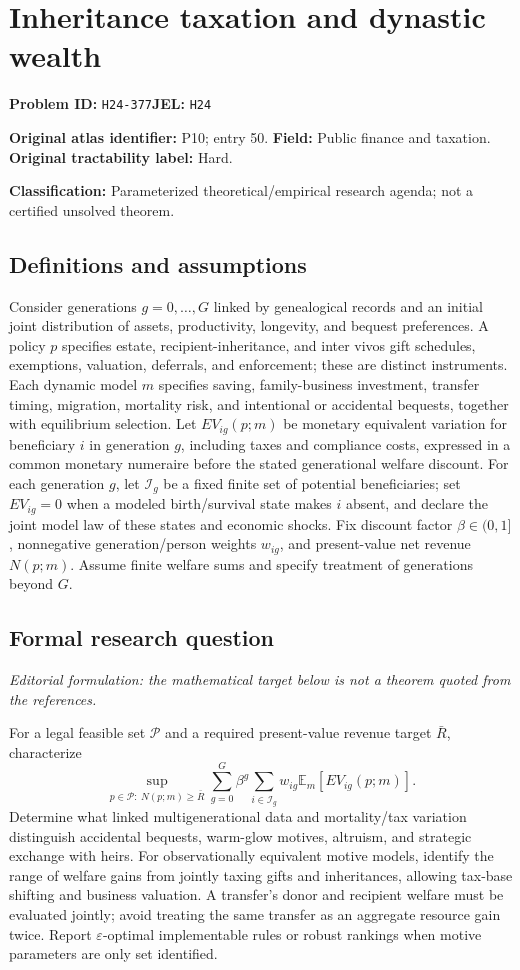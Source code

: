 \documentclass[11pt,a4paper]{article}
\begin{document}
\section*{Inheritance taxation and dynastic wealth}
\textbf{Problem ID:} \texttt{H24-377}\quad \textbf{JEL:} \texttt{H24}\par
\label{problem:OP-0050}
\label{atlas:prob:P10}
\noindent\textbf{Original atlas identifier:} P10; entry 50. \textbf{Field:} Public finance and taxation. \textbf{Original tractability label:} Hard.

\noindent\textbf{Classification:} Parameterized theoretical/empirical research agenda; not a certified unsolved theorem.

\subsection*{Definitions and assumptions}
Consider generations $g=0,\ldots,G$ linked by genealogical records and an initial joint distribution of assets, productivity, longevity, and bequest preferences. A policy $p$ specifies estate, recipient-inheritance, and inter vivos gift schedules, exemptions, valuation, deferrals, and enforcement; these are distinct instruments. Each dynamic model $m$ specifies saving, family-business investment, transfer timing, migration, mortality risk, and intentional or accidental bequests, together with equilibrium selection. Let $EV_{ig}(p;m)$ be monetary equivalent variation for beneficiary $i$ in generation $g$, including taxes and compliance costs, expressed in a common monetary numeraire before the stated generational welfare discount. For each generation $g$, let $\mathcal I_g$ be a fixed finite set of potential beneficiaries; set $EV_{ig}=0$ when a modeled birth/survival state makes $i$ absent, and declare the joint model law of these states and economic shocks. Fix discount factor $\beta\in(0,1]$, nonnegative generation/person weights $w_{ig}$, and present-value net revenue $N(p;m)$. Assume finite welfare sums and specify treatment of generations beyond $G$.

\subsection*{Formal research question}
\emph{Editorial formulation: the mathematical target below is not a theorem quoted from the references.}

For a legal feasible set $\mathcal P$ and a required present-value revenue target $\bar R$, characterize
\[
 \sup_{p\in\mathcal P:\ N(p;m)\geq\bar R}
 \sum_{g=0}^{G}\beta^g\sum_{i\in\mathcal I_g}w_{ig}\mathbb E_m[EV_{ig}(p;m)].
\]
Determine what linked multigenerational data and mortality/tax variation distinguish accidental bequests, warm-glow motives, altruism, and strategic exchange with heirs. For observationally equivalent motive models, identify the range of welfare gains from jointly taxing gifts and inheritances, allowing tax-base shifting and business valuation. A transfer's donor and recipient welfare must be evaluated jointly; avoid treating the same transfer as an aggregate resource gain twice. Report $\varepsilon$-optimal implementable rules or robust rankings when motive parameters are only set identified.
\end{document}
